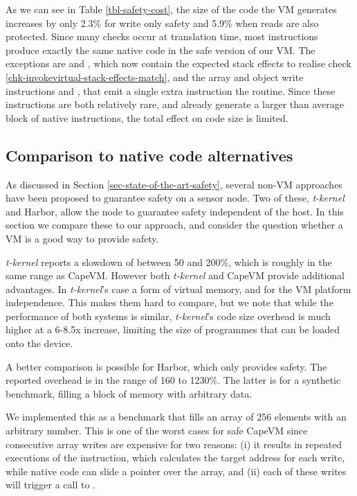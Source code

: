 As we can see in Table \ref{tbl-safety-cost}, the size of the code the VM generates increases by only 2.3\% for write only safety and 5.9\% when reads are also protected. Since many checks occur at translation time, most instructions produce exactly the same native code in the safe version of our VM. The exceptions are  and , which now contain the expected stack effects to realise check \ref{chk-invokevirtual-stack-effects-match}, and the array and object write instructions  and , that emit a single extra  instruction the  routine. Since these instructions are both relatively rare, and already generate a larger than average block of native instructions, the total effect on code size is limited.

\subsection{Comparison to native code alternatives}
As discussed in Section \ref{sec-state-of-the-art-safety}, several non-VM approaches have been proposed to guarantee safety on a sensor node. Two of these, \emph{t-kernel} and Harbor, allow the node to guarantee safety independent of the host. In this section we compare these to our approach, and consider the question whether a VM is a good way to provide safety.

\emph{t-kernel} reports a slowdown of between 50 and 200\%, which is roughly in the same range as CapeVM. However both \emph{t-kernel} and CapeVM provide additional advantages. In \emph{t-kernel}'s case a form of virtual memory, and for the VM platform independence. This makes them hard to compare, but we note that while the performance of both systems is similar, \emph{t-kernel}'s code size overhead is much higher at a 6-8.5x increase, limiting the size of programmes that can be loaded onto the device.

A better comparison is possible for Harbor, which only provides safety. The reported overhead is in the range of 160 to 1230\%. The latter is for a synthetic benchmark, filling a block of memory with arbitrary data.

We implemented this as a benchmark that fills an array of 256 elements with an arbitrary number. This is one of the worst cases for safe CapeVM since consecutive array writes are expensive for two reasons: (i) it results in repeated executions of the  instruction, which calculates the target address for each write, while native code can slide a pointer over the array, and (ii) each of these writes will trigger a call to .

